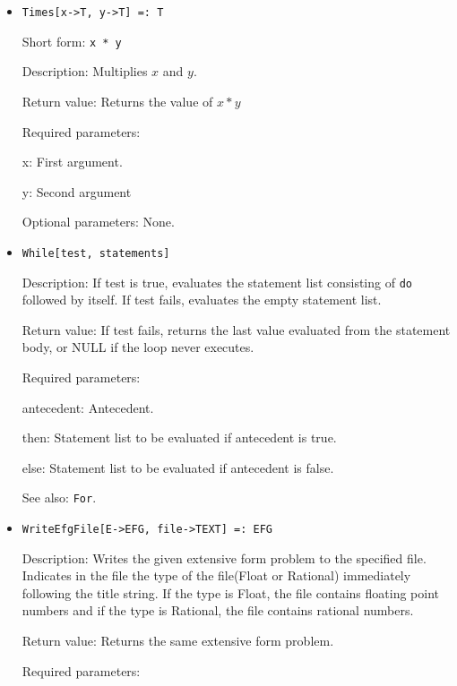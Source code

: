 \begin{itemize}

\item 
\protect \large \begin{verbatim}
Times[x->T, y->T] =: T
\end{verbatim} \normalsize
  
\bd
\item
[Short form:] \verb+x * y+
\item
[Description:] Multiplies $x$ and $y$.
\item
[Return value:] Returns the value of $x * y$  
\item
[Required parameters:]\hfil\null
\bd
\item
[x:] First argument.  
\item
[y:] Second argument
\ed
\item
[Optional parameters:] None.
\ed




\item 
\protect \large \begin{verbatim}
While[test, statements]
\end{verbatim} \normalsize
  
\bd
\item
[Description:] If test is true, evaluates the statement list consisting of
\verb+do+ followed by itself.  If test fails, evaluates the empty
statement list.
\item
[Return value:] If test fails, returns the last value evaluated from the
statement body, or NULL if the loop never executes.

\item
[Required parameters:]\hfil\null
\bd
\item
[antecedent:] Antecedent.  
\item
[then:] Statement list to be evaluated if antecedent is true. 
\item
[else:] Statement list to be evaluated if antecedent is false. 
\ed
\item
[See also:] \verb+For+.
\ed

\item

\protect \large \begin{verbatim}
WriteEfgFile[E->EFG, file->TEXT] =: EFG
\end{verbatim}\normalsize

\bd
\item
[Description:] Writes the given extensive form problem to the
specified file.  Indicates in the file the type of the file(Float or
Rational) immediately following the title string.  If the type is
Float, the file contains floating point numbers and if the type is
Rational, the file contains rational numbers.
\item
[Return value:] Returns the same extensive form problem.
\item
[Required parameters:]\hfil\null


\end{itemize}
